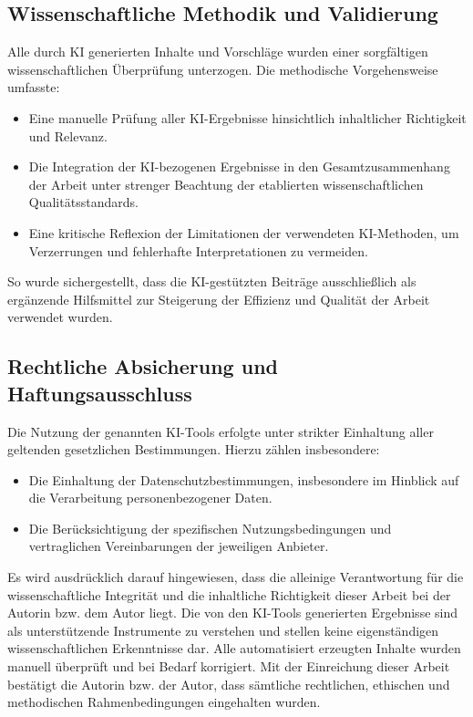 \subsection*{Wissenschaftliche Methodik und Validierung}
Alle durch KI generierten Inhalte und Vorschläge wurden einer sorgfältigen wissenschaftlichen Überprüfung unterzogen. Die methodische Vorgehensweise umfasste:
\begin{itemize}
    \item Eine manuelle Prüfung aller KI-Ergebnisse hinsichtlich inhaltlicher Richtigkeit und Relevanz.
    \item Die Integration der KI-bezogenen Ergebnisse in den Gesamtzusammenhang der Arbeit unter strenger Beachtung der etablierten wissenschaftlichen Qualitätsstandards.
    \item Eine kritische Reflexion der Limitationen der verwendeten KI-Methoden, um Verzerrungen und fehlerhafte Interpretationen zu vermeiden.
\end{itemize}
So wurde sichergestellt, dass die KI-gestützten Beiträge ausschließlich als ergänzende Hilfsmittel zur Steigerung der Effizienz und Qualität der Arbeit verwendet wurden.

\subsection*{Rechtliche Absicherung und Haftungsausschluss}
Die Nutzung der genannten KI-Tools erfolgte unter strikter Einhaltung aller geltenden gesetzlichen Bestimmungen. Hierzu zählen insbesondere:
\begin{itemize}
    \item Die Einhaltung der Datenschutzbestimmungen, insbesondere im Hinblick auf die Verarbeitung personenbezogener Daten.
    \item Die Berücksichtigung der spezifischen Nutzungsbedingungen und vertraglichen Vereinbarungen der jeweiligen Anbieter.
\end{itemize}
Es wird ausdrücklich darauf hingewiesen, dass die alleinige Verantwortung für die wissenschaftliche Integrität und die inhaltliche Richtigkeit dieser Arbeit bei der Autorin bzw. dem Autor liegt. Die von den KI-Tools generierten Ergebnisse sind als unterstützende Instrumente zu verstehen und stellen keine eigenständigen wissenschaftlichen Erkenntnisse dar. Alle automatisiert erzeugten Inhalte wurden manuell überprüft und bei Bedarf korrigiert. Mit der Einreichung dieser Arbeit bestätigt die Autorin bzw. der Autor, dass sämtliche rechtlichen, ethischen und methodischen Rahmenbedingungen eingehalten wurden.

